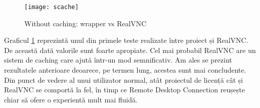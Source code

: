\begin{figure}
    \centering
    \texttt{[image: scache]}
    \caption{Without caching: wrapper vs RealVNC}
    \label{fig:cache}
\end{figure}

Graficul \ref{fig:cache} reprezintă unul din primele teste realizate între proiect și RealVNC. De această dată valorile sunt foarte apropiate. Cel mai probabil RealVNC are un sistem de caching care ajută într-un mod semnificativ. Am ales se prezint rezultatele anterioare deoarece, pe termen lung, acestea sunt mai concludente. Din punct de vedere al unui utilizator normal, atât proiectul de licență cât și RealVNC se comportă la fel, în timp ce Remote Desktop Connection reușește chiar să ofere o experientă mult mai fluidă.
